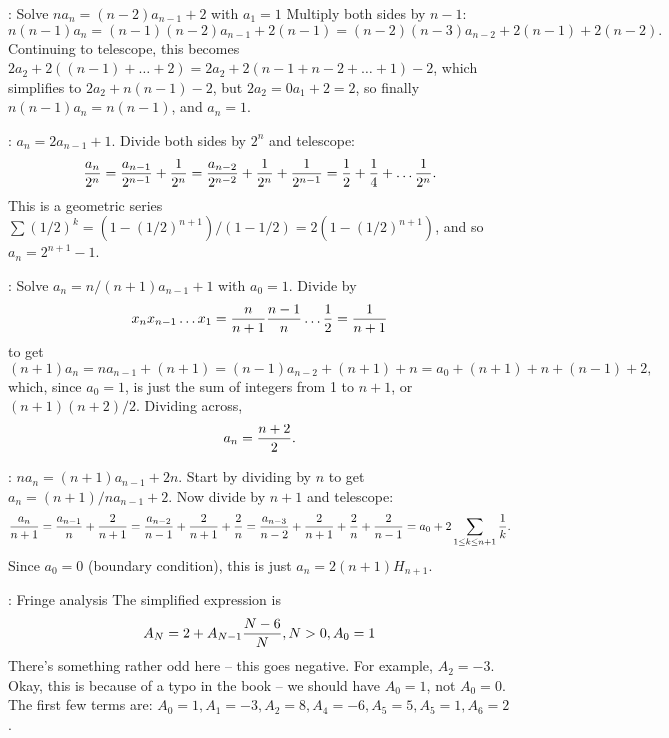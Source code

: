 \vskip 0.08in : Solve $n a_n = \left(n - 2\right) a_{n-1} + 2$
with $a_1 = 1$\hfil\break
Multiply both sides by $n-1$: 
$$
n \left(n - 1\right) a_n = 
\left(n - 1 \right) \left(n - 2\right) a_{n-1} + 2 \left(n - 1\right) =
\left(n - 2 \right) \left(n - 3\right) a_{n-2} + 2 \left(n - 1\right) + 2 \left(n - 2\right).
$$
Continuing to telescope, this becomes $2 a_2 + 2 \left(\left(n - 1\right) + \ldots + 2\right)
= 2 a_2 + 2 \left(n - 1 + n - 2 + \ldots + 1\right) - 2$, which simplifies to
$2 a_2 + n \left(n - 1\right) - 2$, but $2 a_2 = 0 a_1 + 2 = 2$, so finally
$n \left(n - 1\right) a_n = n \left(n - 1\right)$, and $a_n = 1$.

\vskip 0.08in : $a_n = 2 a_{n-1} + 1$.\hfil\break
Divide both sides by $2^n$ and telescope:
$$
{a_n \over 2^n} = {a_{n-1} \over 2^{n-1}} + {1 \over 2^n} =
{a_{n-2} \over 2^{n-2}} + {1 \over 2^n} + {1 \over 2^{n-1}} = {1 \over 2}
+ {1 \over 4} + \ldots {1 \over 2^n}.
$$
This is a geometric series $\sum \left(1/2\right)^k = \left(1 - \left(1/2\right)^{n+1}\right) /
\left(1 - 1/2\right) = 2 \left(1 - \left(1 / 2\right)^{n+1}\right)$, and so
$a_n = 2^{n+1} - 1$.

\vskip 0.08in : Solve $a_n = n / \left(n+1\right) a_{n-1} + 1$ with 
$a_0 = 1$.\hfil\break
Divide by 
$$
 x_n x_{n-1} \ldots x_1 = {n \over n + 1} {n - 1 \over n} \ldots {1 \over 2} = {1 \over n + 1}
$$
to get
$$
 \left(n + 1\right) a_n = n a_{n-1} + \left(n + 1\right)
  = \left(n - 1\right) a_{n-2} + \left(n + 1\right) + n = a_0 + \left(n+1\right) + n +
  \left(n - 1\right) + 2,
$$
which, since $a_0 = 1$, is just the sum of integers from 1 to $n+1$, or
$\left(n + 1\right)\left(n + 2\right) / 2$.  Dividing across,
$$ 
 a_n = {n + 2 \over 2}.
$$

\vskip 0.08in : $n a_n = \left(n + 1\right) a_{n-1} + 2 n$.
\hfil\break Start by dividing by $n$ to get $a_n = \left(n + 1\right) / n a_{n-1} + 2$.
Now divide by $n+1$ and telescope:
$$
 {a_n \over n + 1} = {a_{n-1} \over n} + {2 \over n + 1} =
 {a_{n-2} \over n - 1} + {2 \over n + 1} + {2 \over n} =
 {a_{n-3} \over n - 2} + {2 \over n + 1} + {2 \over n} + {2 \over n - 1} =
 a_0 + 2 \sum_{1 \le k \le n + 1} {1 \over k}.
$$
Since $a_0 = 0$ (boundary condition), this is just $a_n = 2 \left(n + 1\right) H_{n + 1}$.

\vskip 0.08in : Fringe analysis\hfil\break
The simplified expression is
$$
 A_N = 2 + A_{N-1} {N - 6 \over N}, N > 0, A_0 = 1
$$
There's something rather odd here -- this goes negative.  For example,
$A_2 = -3$.   Okay, this is because of a typo in the book -- we should have
$A_0 = 1$, not $A_0 = 0$.  The first few terms are:
$A_0 = 1, A_1 = -3, A_2 =  8, A_4=-6, A_5=5, A_5 = 1, A_6 = 2$.

